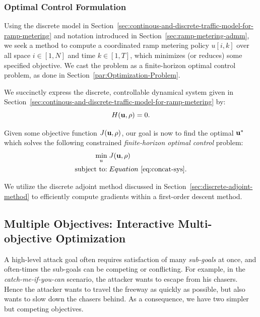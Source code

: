 \subsubsection{Optimal Control Formulation}

Using the discrete model in Section~\ref{sec:continous-and-discrete-traffic-model-for-ramp-metering} and notation introduced in Section~\ref{sec:ramp-metering-admm}, we seek a method to compute a coordinated ramp metering policy $u\left[i,k\right]$ over all space $i\in\left[1,N\right]$ and time $k\in\left[1,T\right]$, which minimizes (or reduces) some specified objective. We cast the problem as a finite-horizon optimal control problem, as done in Section~\ref{par:Optimization-Problem}.

We succinctly express the discrete, controllable dynamical system given in Section~\ref{sec:continous-and-discrete-traffic-model-for-ramp-metering} by:
	\begin{equation}
	\label{eq:concat-sys}
		H\left(\vectorize{u}, \vectorize{\rho}\right)=0.
	\end{equation}

Given some objective function $J\left(\vectorize{u}, \vectorize{\rho}\right)$, our goal is now to find the optimal $\mathbf{u}^*$ which solves the following constrained \emph{finite-horizon optimal control} problem:
	\begin{align}
		\label{eqn:fhoc}
		\min_{u} \;& J\left(\vectorize{u}, \vectorize{\rho}\right) \\
		\text{subject to:} \;& Equation~\eqref{eq:concat-sys} \label{eqn:repeat-concat-system}.
	\end{align}

We utilize the discrete adjoint method discussed in Section~\ref{sec:discrete-adjoint-method} to efficiently compute gradients within a first-order descent method.

\subsection{Multiple Objectives: Interactive Multi-objective Optimization}
	\label{sub:moo}
		A high-level attack goal often requires satisfaction of many \emph{sub-goals} at once, and often-times the sub-goals can be competing or conflicting. For example, in the \emph{catch-me-if-you-can} scenario, the attacker wants to escape from his chasers. Hence the attacker wants to travel the freeway as quickly as possible, but also wants to slow down the chasers behind. As a consequence, we have two simpler but competing objectives.

